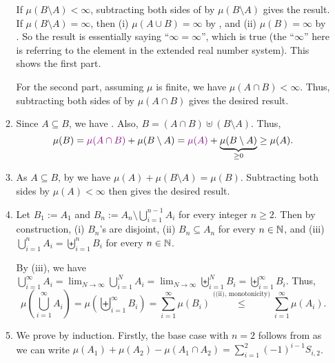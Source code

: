 \begin{enumerate}
\begin{pf}
\begin{enumerate}
If \(\mu(B\setminus A)<\infty\), subtracting both sides of
 by \(\mu(B\setminus A)\) gives the result. If
\(\mu(B\setminus A)=\infty\), then (i) \(\mu(A\cup B)=\infty\) by
, and (ii) \(\mu(B)=\infty\) by . So the result
is essentially saying ``\(\infty=\infty\)'', which is true (the ``\(\infty\)''
here is referring to the element in the extended real number system). This
shows the first part.

For the second part, assuming \(\mu\) is finite, we have \(\mu(A\cap B)<\infty\).
Thus, subtracting both sides of   by \(\mu(A\cap B)\)
gives the desired result.
\item Since \(A\subseteq B\), we have . Also, \(B=(A\cap
B)\uplus (B\setminus A)\). Thus,
\[
\mu(B)=\vc{\mu(A\cap B)}+\mu(B\setminus A)
=\vc{\mu(A)}+\underbrace{\mu(B\setminus A)}_{\ge 0}
\ge \mu(A).
\]
\item As \(A\subseteq B\), by  we have \(\mu(A)+\mu(B\setminus
A)=\mu(B)\). Subtracting both sides by \(\mu(A)<\infty\) then gives the desired
result.
\item Let \(B_1:=A_1\) and \(B_n:=A_n\setminus \bigcup_{i=1}^{n-1}A_i\) for
every integer \(n\ge 2\).  Then by construction, (i) \(B_n\)'s are disjoint,
(ii) \(B_n\subseteq A_n\) for every \(n\in\mathbb{N}\), and (iii)
\(\bigcup_{i=1}^{n}A_i=\biguplus_{i=1}^{n}B_i\) for every \(n\in\mathbb{N}\). 

By (iii), we have \(\bigcup_{i=1}^{\infty}A_i
=\lim_{N\to\infty}\bigcup_{i=1}^{N}A_i =\lim_{N\to\infty}\biguplus_{i=1}^{N}B_i
=\biguplus_{i=1}^{\infty}B_i \). Thus,
\[
\mu\left(\bigcup_{i=1}^{\infty}A_i\right)
=\mu\left(\biguplus_{i=1}^{\infty}B_i\right)
=\sum_{i=1}^{\infty}\mu(B_i)
\overset{\text{((ii), monotonicity)}}{\le}\sum_{i=1}^{\infty}\mu(A_i).
\]
\item We prove by induction. Firstly, the base case with \(n=2\) follows from
 as we can write
\(\mu(A_1)+\mu(A_2)-\mu(A_1\cap A_2)=\sum_{i=1}^{2}(-1)^{i-1}S_{i,2}\).


\end{enumerate}
\end{pf}
\end{enumerate}
